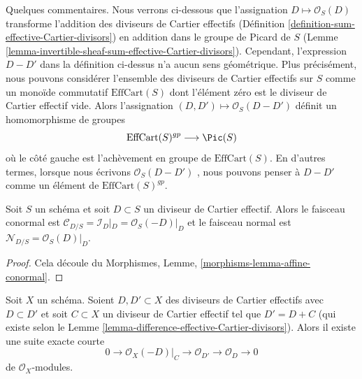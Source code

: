 \noindent
Quelques commentaires. Nous verrons ci-dessous que l'assignation  $D \mapsto \mathcal{O}_S(D)$ 
transforme l'addition des diviseurs de Cartier effectifs (Définition  \ref{definition-sum-effective-Cartier-divisors})
en addition dans le groupe de Picard de  $S$  (Lemme  \ref{lemma-invertible-sheaf-sum-effective-Cartier-divisors}).
Cependant, l'expression  $D - D'$  dans la définition ci-dessus n'a aucun sens
géométrique. Plus précisément, nous pouvons considérer l'ensemble des diviseurs de
Cartier effectifs sur  $S$  comme un monoïde commutatif  $\text{EffCart}(S)$  dont
l'élément zéro est le diviseur de Cartier effectif vide. Alors l'assignation
 $(D, D') \mapsto \mathcal{O}_S(D - D')$  définit un homomorphisme de groupes
$$
\text{EffCart}(S)^{gp} \longrightarrow \Pic(S)
$$
où le côté gauche est l'achèvement en groupe de  $\text{EffCart}(S)$. En d'autres termes,
lorsque nous écrivons  $\mathcal{O}_S(D - D')$ , nous pouvons penser à  $D - D'$  comme un
élément de  $\text{EffCart}(S)^{gp}$.

\begin{lemma}
\label{lemma-conormal-effective-Cartier-divisor}
Soit  $S$  un schéma et soit  $D \subset S$  un diviseur de Cartier effectif.
Alors le faisceau conormal est  $\mathcal{C}_{D/S} = \mathcal{I}_D|_D =
\mathcal{O}_S(-D)|_D$  et le faisceau normal est
 $\mathcal{N}_{D/S} = \mathcal{O}_S(D)|_D$.
\end{lemma}

\begin{proof}
Cela découle du Morphismes, Lemme,  \ref{morphisms-lemma-affine-conormal}.
\end{proof}

\begin{lemma}
\label{lemma-ses-add-divisor}
Soit  $X$  un schéma. Soient  $D, D' \subset X$  des diviseurs de Cartier
effectifs avec  $D \subset D'$  et soit  $C \subset X$  un diviseur de Cartier effectif
tel que  $D' = D + C$  (qui existe selon le Lemme  \ref{lemma-difference-effective-Cartier-divisors}). Alors il existe une
suite exacte courte
$$
0 \to \mathcal{O}_X(-D)|_C \to \mathcal{O}_{D'} \to \mathcal{O}_D \to 0
$$
de  $\mathcal{O}_X$-modules.
\end{lemma}

